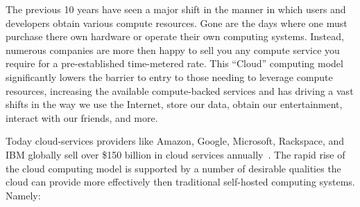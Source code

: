The previous 10 years have seen a major shift in the manner in which
users and developers obtain various compute resources. Gone are the
days where one must purchase there own hardware or operate their own
computing systems. Instead, numerous companies are more then happy to
sell you any compute service you require for a pre-established
time-metered rate. This ``Cloud'' computing model significantly lowers
the barrier to entry to those needing to leverage compute resources,
increasing the available compute-backed services and has driving a
vast shifts in the way we use the Internet, store our data, obtain our
entertainment, interact with our friends, and more.

Today cloud-services providers like Amazon, Google, Microsoft,
Rackspace, and IBM globally sell over \$150 billion in cloud services
annually~\cite{Flood2013}. The rapid rise of the cloud computing model
is supported by a number of desirable qualities the cloud can provide
more effectively then traditional self-hosted computing
systems. Namely:

